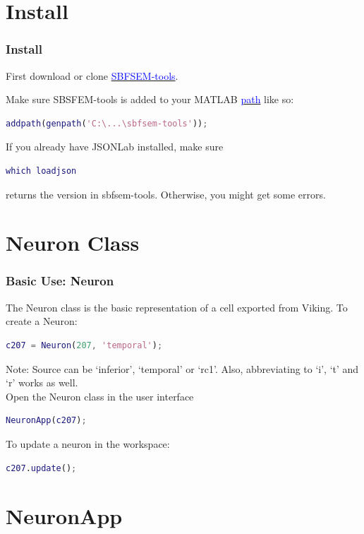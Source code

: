 \documentclass[11pt]{beamer}
\begin{document}
\section{Install}
\begin{frame}[fragile]
	\frametitle{Install}
	First download or clone \href{www.github.com/sarastokes/sbfsem-tools}{\textcolor{blue}{SBFSEM-tools}}.
	
	Make sure SBSFEM-tools is added to your MATLAB \href{https://www.mathworks.com/help/matlab/ref/addpath.html}{\textcolor{blue}{path}} like so:
	\begin{lstlisting}[language=matlab]	
	addpath(genpath('C:\...\sbfsem-tools'));\end{lstlisting}
	If you already have JSONLab installed, make sure 
	\begin{lstlisting}[language=matlab] 
	which loadjson\end{lstlisting} 
	returns the version in sbfsem-tools. Otherwise, you might get some errors.
\end{frame}
\section{Neuron Class}
\begin{frame}[fragile]
	\frametitle{Basic Use: Neuron}
	The Neuron class is the basic representation of a cell exported from Viking. To create a Neuron:
\begin{lstlisting}[language=matlab]
% cellName = Neuron(cellID, 'source');
c207 = Neuron(207, 'temporal');\end{lstlisting}
Note: Source can be `inferior', `temporal' or `rc1'. Also, abbreviating to `i', `t' and `r' works as well.\\
Open the Neuron class in the user interface
\begin{lstlisting}[language=matlab]
NeuronApp(c207);\end{lstlisting}
To update a neuron in the workspace:
\begin{lstlisting}[language=matlab]
c207.update();\end{lstlisting}
\end{frame}
\section{NeuronApp}
\end{document}

